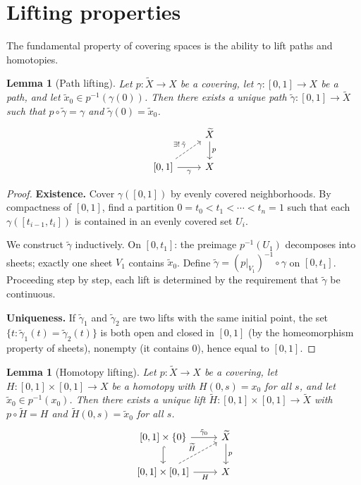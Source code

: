 \documentclass[12pt,a4paper,openany]{book}
\theoremstyle{definition}
\theoremstyle{plain}
\newtheorem{lemma}[definition]{Lemma}
\theoremstyle{remark}
\begin{document}
\section{Lifting properties}\label{sec:lifting}

The fundamental property of covering spaces is the ability to lift paths
and homotopies.

\begin{lemma}[Path lifting]\label{lem:path-lifting}
  Let $p\colon \widetilde{X} \to X$ be a covering, let
  $\gamma\colon [0,1] \to X$ be a path, and let
  $\tilde{x}_0 \in p^{-1}(\gamma(0))$.  Then there exists a unique path
  $\tilde{\gamma}\colon [0,1] \to \widetilde{X}$ such that
  $p \circ \tilde{\gamma} = \gamma$ and $\tilde{\gamma}(0) = \tilde{x}_0$.
  \[
    \begin{tikzcd}
      & \widetilde{X} \ar[d,"p"] \\
      {[0,1]} \ar[r,"\gamma"'] \ar[ur,dashed,"\exists!\,\tilde\gamma"] & X
    \end{tikzcd}
  \]
\end{lemma}

\begin{proof}
  \textbf{Existence.}
  Cover $\gamma([0,1])$ by evenly covered neighborhoods.  By compactness of
  $[0,1]$, find a partition $0 = t_0 < t_1 < \cdots < t_n = 1$ such that each
  $\gamma([t_{i-1}, t_i])$ is contained in an evenly covered set $U_i$.

  We construct $\tilde{\gamma}$ inductively.  On $[0, t_1]$: the preimage
  $p^{-1}(U_1)$ decomposes into sheets; exactly one sheet $V_1$ contains
  $\tilde{x}_0$.  Define $\tilde{\gamma} = (p|_{V_1})^{-1} \circ \gamma$ on
  $[0, t_1]$.  Proceeding step by step, each lift is determined by the
  requirement that $\tilde{\gamma}$ be continuous.

  \textbf{Uniqueness.}
  If $\tilde{\gamma}_1$ and $\tilde{\gamma}_2$ are two lifts with the same
  initial point, the set $\{t : \tilde{\gamma}_1(t) = \tilde{\gamma}_2(t)\}$
  is both open and closed in $[0,1]$ (by the homeomorphism property of
  sheets), nonempty (it contains $0$), hence equal to $[0,1]$.
\end{proof}

\begin{lemma}[Homotopy lifting]\label{lem:homotopy-lifting}
  Let $p\colon \widetilde{X} \to X$ be a covering, let
  $H\colon [0,1] \times [0,1] \to X$ be a homotopy with
  $H(0,s) = x_0$ for all $s$, and let $\tilde{x}_0 \in p^{-1}(x_0)$.
  Then there exists a unique lift
  $\widetilde{H}\colon [0,1] \times [0,1] \to \widetilde{X}$ with
  $p \circ \widetilde{H} = H$ and $\widetilde{H}(0,s) = \tilde{x}_0$ for all
  $s$.
  \[
    \begin{tikzcd}
      {[0,1] \times \{0\}} \ar[r,"\tilde{\gamma}_0"] \ar[d,hook] &
        \widetilde{X} \ar[d,"p"] \\
      {[0,1] \times [0,1]} \ar[r,"H"'] \ar[ur,dashed,"\widetilde{H}"] & X
    \end{tikzcd}
  \]
\end{lemma}
\end{document}

